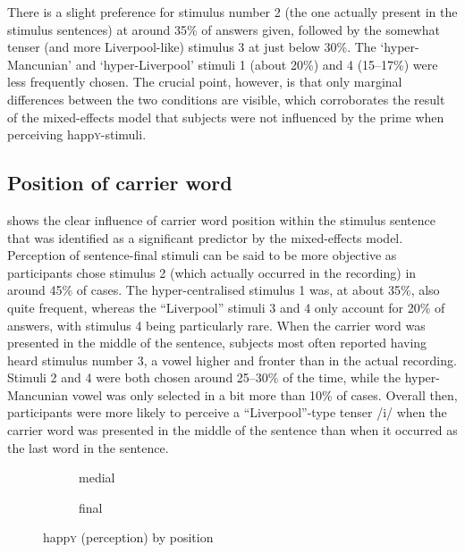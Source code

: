 There is a slight preference for stimulus number 2 (the one actually present in the stimulus sentences) at around 35\% of answers given, followed by the somewhat tenser (and more Liverpool-like) stimulus 3 at just below 30\%.
The `hyper-Mancunian' and `hyper-Liverpool' stimuli 1 (about 20\%) and 4 (15--17\%) were less frequently chosen.
The crucial point, however, is that only marginal differences between the two conditions are visible, which corroborates the result of the mixed-effects model that subjects were not influenced by the prime when perceiving happ\textsc{y}-stimuli.

\subsection{Position of carrier word}
\label{sec.perc_res.happy.position}

 shows the clear influence of carrier word position within the stimulus sentence that was identified as a significant predictor by the mixed-effects model.
Perception of sentence-final stimuli can be said to be more objective as participants chose stimulus 2 (which actually occurred in the recording) in around 45\% of cases.
The hyper-centralised stimulus 1 was, at about 35\%, also quite frequent, whereas the ``Liverpool'' stimuli 3 and 4 only account for 20\% of answers, with stimulus 4 being particularly rare.
When the carrier word was presented in the middle of the sentence, subjects most often reported having heard stimulus number 3, a vowel higher and fronter than in the actual recording.
Stimuli 2 and 4 were both chosen around 25--30\% of the time, while the hyper-Mancunian vowel was only selected in a bit more than 10\% of cases.
Overall then, participants were more likely to perceive a ``Liverpool''-type tenser /i/ when the carrier word was presented in the middle of the sentence than when it occurred as the last word in the sentence.

\begin{figure}
	
	\begin{subfigure}{0.49\textwidth}
		
			\resizebox{\linewidth}{!}{} 
		\caption{medial}
		\label{fig.bar.happy.tot.ext.med}
	\end{subfigure}
	\begin{subfigure}{0.49\textwidth}
		
			\resizebox{\linewidth}{!}{} 
		\caption{final}
		\label{fig.bar.happy.tot.ext.fin}
	\end{subfigure}
	\caption{happ\textsc{y} (perception) by position}
	\label{fig.bar.happy.tot.ext.pos}
\end{figure}

